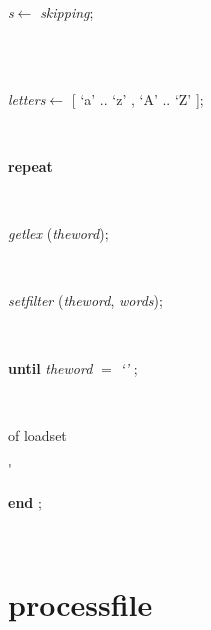 \documentclass[10pt, a4paper]{article}
\begin{document}
\begin{tabbing}
\parbox{14cm}{\textsf{\textit{s}$\leftarrow$ \textit{skipping}}; }\\
\\
\parbox{14cm}{\textsf{\textit{letters}$\leftarrow$ \textit{}[\textrm{\textup { `a' } }..\textrm{\textup { `z' } }, \textrm{\textup { `A' } }..\textrm{\textup { `Z' } }]}; }\\
\+\parbox{14cm}{\textsf{\textbf{repeat} }}\\
\parbox{14cm}{\textsf{\textit{getlex} (\textit{theword})}; }\\
\parbox{14cm}{\textsf{\textit{setfilter} (\textit{theword}, \textit{words})}; }\\
\-\<\parbox{14cm}{\textsf {\textbf {until } \textsf{\textit{theword} $=$ \textit{\textrm{\textup { `' } }}}; }}\\
\<\-\parbox{3.5cm}{\scriptsize{of loadset}}\'\parbox{14cm}{\textsf{\textbf{end}  ;}}\\
\end{tabbing}
\section{processfile}\label{sec:indexfilesprocessfile}
\end{document}
